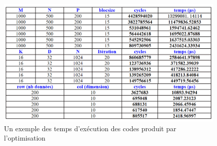 \documentclass[12pt,a4paper]{article}
\begin{document}
\begin{figure}[H]
	\centering
	\includegraphics[width=\linewidth]{soft/screenshot007}
	\caption{Un exemple des temps d'exécution des codes produit par l'optimisation}
	\label{fig:screenshot007}
\end{figure}
\end{document}
